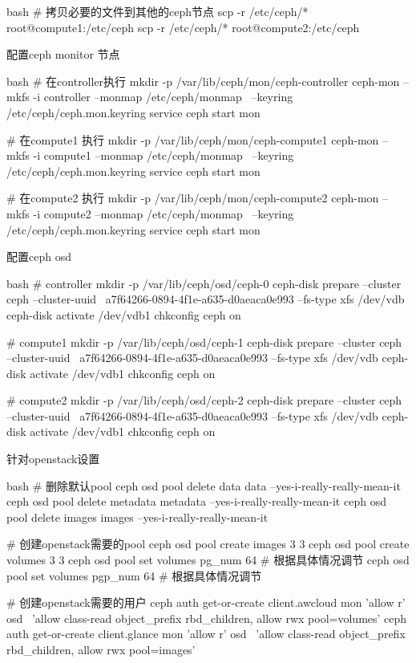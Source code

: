 \begin{outline}[enumerate]
\begin{code-in-enumerate}{bash}
# 拷贝必要的文件到其他的ceph节点
scp -r /etc/ceph/* root@compute1:/etc/ceph
scp -r /etc/ceph/* root@compute2:/etc/ceph
\end{code-in-enumerate}

  \1 配置ceph monitor 节点
\begin{code-in-enumerate}{bash}
# 在controller执行
mkdir -p /var/lib/ceph/mon/ceph-controller
ceph-mon --mkfs -i controller --monmap /etc/ceph/monmap \
    --keyring /etc/ceph/ceph.mon.keyring
service ceph start mon

# 在compute1 执行
mkdir -p /var/lib/ceph/mon/ceph-compute1
ceph-mon --mkfs -i compute1 --monmap /etc/ceph/monmap \
    --keyring /etc/ceph/ceph.mon.keyring
service ceph start mon

# 在compute2 执行
mkdir -p /var/lib/ceph/mon/ceph-compute2
ceph-mon --mkfs -i compute2 --monmap /etc/ceph/monmap \
    --keyring /etc/ceph/ceph.mon.keyring
service ceph start mon
\end{code-in-enumerate}

  \1 配置ceph osd
\begin{code-in-enumerate}{bash}
# controller
mkdir -p /var/lib/ceph/osd/ceph-0
ceph-disk prepare --cluster ceph --cluster-uuid \
    a7f64266-0894-4f1e-a635-d0aeaca0e993 --fs-type xfs  /dev/vdb
ceph-disk activate /dev/vdb1
chkconfig ceph on

# compute1
mkdir -p /var/lib/ceph/osd/ceph-1
ceph-disk prepare --cluster ceph --cluster-uuid \
    a7f64266-0894-4f1e-a635-d0aeaca0e993 --fs-type xfs  /dev/vdb
ceph-disk activate /dev/vdb1
chkconfig ceph on

# compute2
mkdir -p /var/lib/ceph/osd/ceph-2
ceph-disk prepare --cluster ceph --cluster-uuid \
    a7f64266-0894-4f1e-a635-d0aeaca0e993 --fs-type xfs  /dev/vdb
ceph-disk activate /dev/vdb1
chkconfig ceph on
\end{code-in-enumerate}

  \1 针对openstack设置
\begin{code-in-enumerate}{bash}
# 删除默认pool
ceph osd pool delete data  data --yes-i-really-really-mean-it
ceph osd pool delete metadata metadata --yes-i-really-really-mean-it
ceph osd pool delete images images --yes-i-really-really-mean-it

# 创建openstack需要的pool
ceph osd pool create images 3 3
ceph osd pool create volumes 3 3
ceph osd pool set volumes pg_num 64  # 根据具体情况调节
ceph osd pool set volumes pgp_num 64 # 根据具体情况调节

# 创建openstack需要的用户
ceph auth get-or-create client.awcloud mon 'allow r' osd \
    'allow class-read object_prefix rbd_children, allow rwx pool=volumes'
ceph auth get-or-create client.glance mon 'allow r' osd \
    'allow class-read object_prefix rbd_children, allow rwx pool=images'


\end{code-in-enumerate}
\end{outline}
